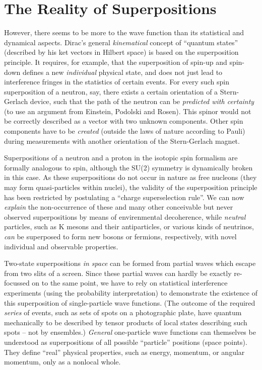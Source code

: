 \section{The Reality of Superpositions}
However, there seems to be more to the wave function than
its statistical and dynamical aspects. Dirac's general {\it
kinematical} concept of ``quantum states'' (described by his ket
vectors in Hilbert space) is based on the superposition
principle. It requires, for example, that the superposition of
spin-up and  spin-down defines a new {\it individual} physical
state, and  does not just lead to interference fringes in the
statistics of certain events. For every such spin superposition of
a neutron, say, there exists a certain orientation of a Stern-Gerlach
device, such that the path of the neutron can be {\it predicted with
certainty} (to use an argument from Einstein, Podolski and Rosen).
This spinor would not be correctly described  as a vector with two
unknown components.  Other spin components have to be
{\it created} (outside
the laws of nature according to Pauli) during measurements with another
orientation of the Stern-Gerlach magnet.

Superpositions of a neutron and a proton in the isotopic spin formalism
are formally analogous to spin, although the SU(2) symmetry
is dynamically broken in this case. As these superpositions do not
occur in nature as free nucleons (they may form quasi-particles within
nuclei), the validity of the superposition principle has been
restricted by postulating a ``charge superselection rule''. We can
now {\it explain} the non-occurrence of these and many other
conceivable but never observed superpositions by means of
envirenmental decoherence, while {\it neutral} particles, such as K
mesons and their antiparticles, or various kinds of neutrinos, {\it
can} be superposed to form new bosons or fermions, respectively, with
novel individual and observable properties.

Two-state superpositions {\it in space} can be formed from partial
waves which escape from two slits of a screen. Since these partial
waves can hardly be exactly re-focussed on  to the same point, we have
to rely on statistical interference experiments (using the probability
interpretation) to demonstrate the existence of this superposition of
single-particle wave functions. (The outcome of the required {\it
series} of events, such as sets of spots on a photographic plate, have
quantum mechanically to be described by tensor products of local states
describing such spots -- not by ensembles.) {\it General} one-particle
wave functions can themselves be understood as superpositions of all
possible ``particle'' positions (space points). They define ``real''
physical properties, such as energy, momentum, or angular momentum,
only as a nonlocal whole.

